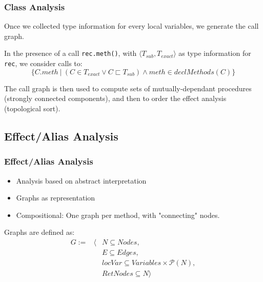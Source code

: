 \documentclass[hyperref={pdfpagelabels=false}]{beamer}
\begin{document}
\begin{frame}[fragile]
    \frametitle{Class Analysis}
    Once we collected type information for every local variables, we generate
    the call graph.

    In the presence of a call \lstinline{rec.meth()}, with
    $\langle T_{sub}, T_{exact} \rangle$ as type information for \lstinline{rec},
    we consider calls to:
    $$
    \{ C.meth ~|~ (C \in T_{exact} \lor C \sqsubset T_{sub}) \land meth \in declMethods(C)\}
    $$

    The call graph is then used to compute sets of mutually-dependant
    procedures (strongly connected components), and then to order the effect
    analysis (topological sort).
\end{frame}

\subsection{Effect/Alias Analysis}
\begin{frame}
    \frametitle{Effect/Alias Analysis}
    \begin{itemize}
        \item Analysis based on abstract interpretation
        \item Graphs as representation
        \item Compositional: One graph per method, with "connecting" nodes.
    \end{itemize}

    Graphs are defined as:
    \begin{eqnarray*}
        G           := &\langle& N \subseteq Nodes, \\
                       && E \subseteq Edges, \\
                       && locVar \subseteq Variables \times \mathcal{P}(N), \\
                       && RetNodes \subseteq N \rangle \\
    \end{eqnarray*}
\end{frame}
\end{document}
